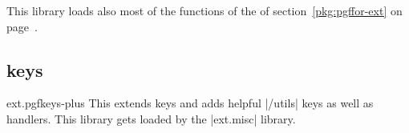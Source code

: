 This library loads also most of the functions of the
 of section~\ref{pkg:pgffor-ext}
on page~\pageref{pkg:pgffor-ext}.
%
%


\subsection{\pgfname keys}
\begin{pgfkeyslibrary}{ext.pgfkeys-plus}
  This extends \pgfname keys and adds helpful |/utils| keys as well as handlers.
  This library gets loaded by the |ext.misc| library.
\end{pgfkeyslibrary}

